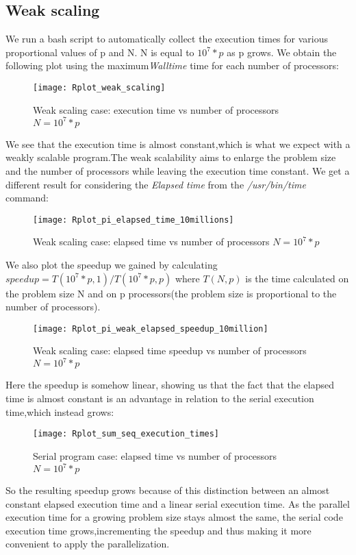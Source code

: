 \documentclass[11pt]{scrartcl} %
\begin{document}
\subsection{Weak scaling}

We run a bash script to automatically collect the execution times for various proportional values of p and N. 
N is equal to $10^7*p$ as p grows.
We obtain the following plot using the maximum\textit{Walltime} time for each number of processors:
\begin{figure}[H] %
	\centering
	\texttt{[image: Rplot\_weak\_scaling]} %
	\caption{Weak scaling case: execution time vs number of processors $N= 10^7*p$}
\end{figure}
We see that the execution time is almost constant,which is what we expect with a weakly scalable program.The weak scalability aims to enlarge the problem size and the number of processors while leaving the execution time constant.
We get a different result for considering the \textit{Elapsed time} from the \textit{/usr/bin/time} command:
\begin{figure}[H] %
	\centering
	\texttt{[image: Rplot\_pi\_elapsed\_time\_10millions]} %
	\caption{Weak scaling case: elapsed time vs number of processors $N= 10^7*p$}
\end{figure}
We also plot the speedup we gained by calculating $speedup = T(10^7*p,1)/T(10^7*p,p)$ where $T(N,p)$ is the time calculated on the problem size N and on p processors(the problem size is proportional to the number of processors).
\begin{figure}[H] %
	\centering
	\texttt{[image: Rplot\_pi\_weak\_elapsed\_speedup\_10million]} %
	\caption{Weak scaling case: elapsed time speedup vs number of processors $N= 10^7*p$}
\end{figure}
Here the speedup is somehow linear, showing us that the fact that the elapsed time is almost constant is an advantage in relation to the serial execution time,which instead grows:
\begin{figure}[H] %
	\centering
	\texttt{[image: Rplot\_sum\_seq\_execution\_times]} %
	\caption{Serial program case: elapsed time vs number of processors $N= 10^7*p$}
\end{figure}
So the resulting speedup grows because of this distinction between an almost constant elapsed execution time and a linear serial execution time. As the parallel execution time for a growing problem size stays almost the same, the serial code execution time grows,incrementing the speedup and thus making it more convenient to apply the parallelization.
\end{document}
